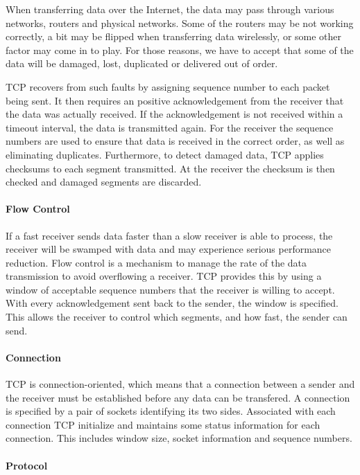 When transferring data over the Internet, the data may pass through various
networks, routers and physical networks. Some of the routers may be not working
correctly, a bit may be flipped when transferring data wirelessly, or some other
factor may come in to play. For those reasons, we have to accept that some of
the data will be damaged, lost, duplicated or delivered out of order.

TCP recovers from such faults by assigning sequence number to each packet being
sent. It then requires an positive acknowledgement from the receiver that the
data was actually received. If the acknowledgement is not received within a
timeout interval, the data is transmitted again. For the receiver the sequence
numbers are used to ensure that data is received in the correct order, as well
as eliminating duplicates. Furthermore, to detect damaged data, TCP applies
checksums to each segment transmitted. At the receiver the checksum is then
checked and damaged segments are discarded.

\paragraph{Flow Control}

If a fast receiver sends data faster than a slow receiver is able to process,
the receiver will be swamped with data and may experience serious performance
reduction. Flow control is a mechanism to manage the rate of the data
transmission to avoid overflowing a receiver. TCP provides this by using a
window of acceptable sequence numbers that the receiver is willing to accept.
With every acknowledgement sent back to the sender, the window is specified.
This allows the receiver to control which segments, and how fast, the sender
can send.

\paragraph{Connection}

TCP is connection-oriented, which means that a connection between a sender and
the receiver must be established before any data can be transfered. A connection
is specified by a pair of sockets identifying its two sides. Associated with
each connection TCP initialize and maintains some status information for each
connection. This includes window size, socket information and sequence numbers.

\paragraph{Protocol}

